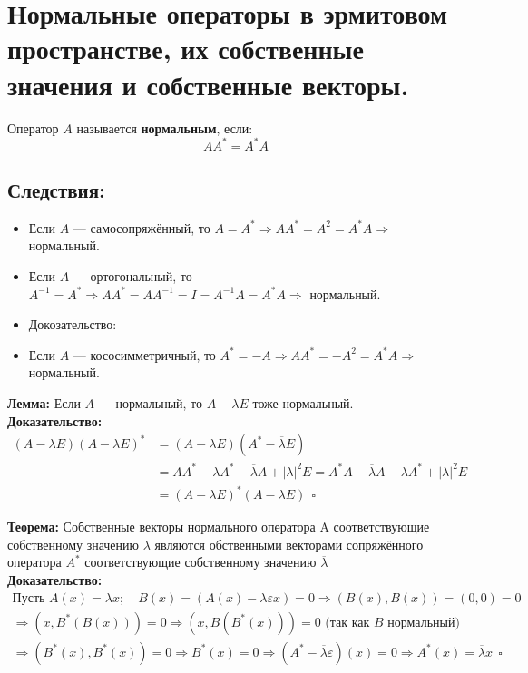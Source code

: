 \documentclass[12pt]{article}
\begin{document}
 \section{Нормальные операторы в эрмитовом пространстве, их собственные значения и собственные векторы.}

Оператор \( A \) называется \textbf{нормальным}, если:
\[
A A^* = A^* A
\]

\subsection*{Следствия:}

\begin{itemize}
    \item Если \( A \) --- самосопряжённый, то \( A = A^* \Rightarrow AA^* = A^2 = A^*A \Rightarrow \) нормальный.
    \item Если \( A \) --- ортогональный, то \( A^{-1} = A^* \Rightarrow AA^* = A A^{-1} = I = A^{-1}A = A^*A \Rightarrow \) нормальный.
    \item Докозательство:
    \item Если \( A \) --- кососимметричный, то \( A^* = -A \Rightarrow AA^* = -A^2 = A^*A \Rightarrow \) нормальный.
\end{itemize}

\textbf{Лемма:} Если \( A \) --- нормальный, то \( A - \lambda E \) тоже нормальный.
\\
\textbf{Доказательство:}
\begin{align*}
    (A - \lambda E)(A - \lambda E)^* &= (A - \lambda E)(A^* - \overline{\lambda} E) \\
    &= AA^* - \lambda A^* - \overline{\lambda} A + |\lambda|^2 E = A^*A - \overline{\lambda} A - \lambda A^* + |\lambda|^2 E \\
    &= (A - \lambda E)^*(A - \lambda E) \ \ \square
\end{align*}

\textbf{Теорема:} Собственные векторы нормального оператора A соответствующие собственному значению \(\lambda\) являются обственными векторами сопряжённого оператора \(A^*\) соответствующие собственному значению \(\overline{\lambda}\) 
\\
\textbf{Доказательство:}
\begin{multline*}
\text{Пусть } A(x)=\lambda x; \quad B(x)=(A(x)-\lambda \varepsilon x)=0 
\Rightarrow (B(x),B(x))=(0,0)=0 \\
\Rightarrow (x,B^*(B(x)))=0 \Rightarrow (x,B(B^*(x)))=0 \text{ (так как $B$ нормальный)} \\
\Rightarrow (B^*(x),B^*(x))=0 \Rightarrow B^*(x)=0 
\Rightarrow (A^* - \overline{\lambda} \varepsilon)(x)=0 \Rightarrow A^*(x)=\overline{\lambda}x \ \ \square
\end{multline*}
\end{document}
